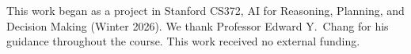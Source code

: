 \documentclass{article}
\begin{document}






\vspace{-6pt}
\begin{ack}
This work began as a project in Stanford CS372, AI for Reasoning, Planning, and Decision Making (Winter 2026). We thank Professor Edward Y.\ Chang for his guidance throughout the course. This work received no external funding.
\end{ack}
\newpage

\end{document}
